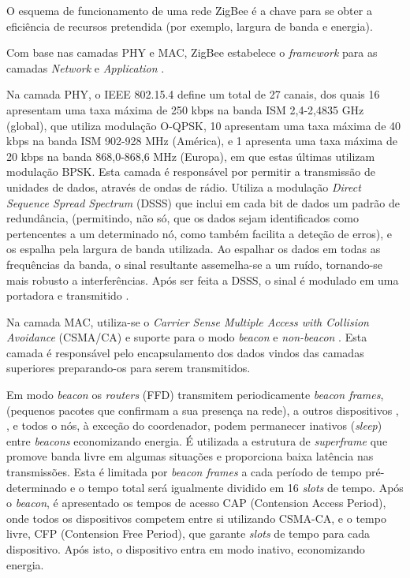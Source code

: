 \documentclass[conference]{IEEEtran}
\begin{document}
O esquema de funcionamento de uma rede ZigBee é a chave para se obter a eficiência de recursos pretendida (por exemplo, largura de banda e energia).

Com base nas camadas PHY e MAC, ZigBee estabelece o \textit{framework} para as camadas \textit{Network} e \textit{Application} \cite{liang2006impact}.

Na camada PHY, o IEEE 802.15.4 define um total de 27 canais, dos quais 16 apresentam uma taxa máxima de 250 kbps na banda ISM 2,4-2,4835 GHz (global), que utiliza modulação O-QPSK, 10 apresentam uma taxa máxima de 40 kbps na banda ISM 902-928 MHz (América), e 1 apresenta uma taxa máxima de 20 kbps na banda 868,0-868,6 MHz (Europa), em que estas últimas utilizam modulação BPSK.
Esta camada é responsável por permitir a transmissão de unidades de dados, através de ondas de rádio.
Utiliza a modulação \textit{Direct Sequence Spread Spectrum} (DSSS) que inclui em cada bit de dados um padrão de redundância, (permitindo, não só, que os dados sejam identificados como pertencentes a um determinado nó, como também facilita a deteção de erros), e os espalha pela largura de banda utilizada.
Ao espalhar os dados em todas as frequências da banda, o sinal resultante assemelha-se a um ruído, tornando-se mais robusto a interferências. 
Após ser feita a DSSS, o sinal é modulado em uma portadora e transmitido \cite{liang2006impact}.

Na camada MAC, utiliza-se o \textit{Carrier Sense Multiple Access with Collision Avoidance} (CSMA/CA) e suporte para o modo \textit{beacon} e \textit{non-beacon} \cite{liang2006impact}.
Esta camada é responsável pelo encapsulamento dos dados vindos das camadas superiores preparando-os para serem transmitidos.

Em modo \textit{beacon} os \textit{routers} (FFD) transmitem periodicamente \textit{beacon frames}, (pequenos pacotes que confirmam a sua presença na rede), a outros dispositivos \cite{cirilo2014computaccao}, \cite{liang2006impact}, e todos o nós, à exceção do coordenador, podem permanecer inativos (\textit{sleep}) entre \textit{beacons} economizando energia.
É utilizada a estrutura de \textit{superframe} que promove banda livre em algumas situações e proporciona baixa latência nas transmissões.
Esta é limitada por \textit{beacon frames} a cada período de tempo pré-determinado e o tempo total será igualmente dividido em 16 \textit{slots} de tempo.
Após o \textit{beacon}, é apresentado os tempos de acesso CAP (Contension Access Period), onde todos os dispositivos competem entre si utilizando CSMA-CA, e o tempo livre, CFP (Contension Free Period), que garante \textit{slots} de tempo para cada dispositivo. 
Após isto, o dispositivo entra em modo inativo, economizando energia.
\end{document}
